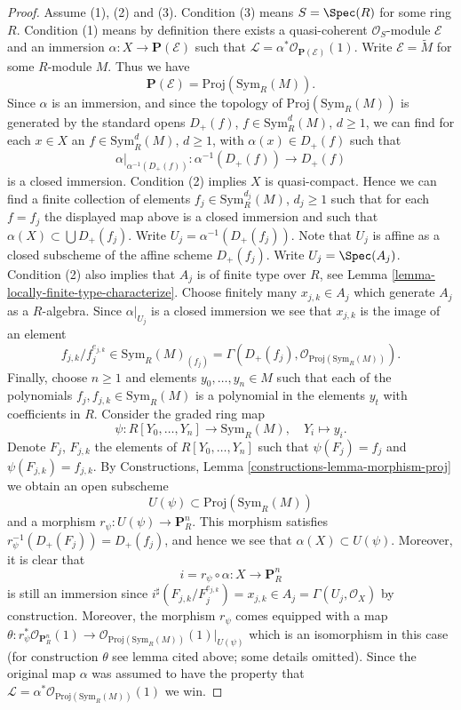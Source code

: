 \begin{proof}
Assume (1), (2) and (3).
Condition (3) means $S = \Spec(R)$ for some ring $R$.
Condition (1) means by definition
there exists a quasi-coherent $\mathcal{O}_S$-module
$\mathcal{E}$ and an immersion $\alpha : X \to \mathbf{P}(\mathcal{E})$
such that $\mathcal{L} = \alpha^*\mathcal{O}_{\mathbf{P}(\mathcal{E})}(1)$.
Write $\mathcal{E} = \widetilde{M}$ for some $R$-module $M$.
Thus we have
$$
\mathbf{P}(\mathcal{E}) = \text{Proj}(\text{Sym}_R(M)).
$$
Since $\alpha$ is an immersion, and since the topology of
$\text{Proj}(\text{Sym}_R(M))$ is generated by the standard
opens $D_{+}(f)$, $f \in \text{Sym}_R^d(M)$, $d \geq 1$,
we can find for each $x \in X$ an
$f \in \text{Sym}_R^d(M)$, $d \geq 1$, with $\alpha(x) \in D_{+}(f)$
such that
$$
\alpha|_{\alpha^{-1}(D_{+}(f))} : \alpha^{-1}(D_{+}(f)) \to D_{+}(f)
$$
is a closed immersion.
Condition (2) implies $X$ is quasi-compact. Hence we can find
a finite collection of elements
$f_j \in \text{Sym}_R^{d_j}(M)$, $d_j \geq 1$
such that for each $f = f_j$ the displayed map above
is a closed immersion and such that $\alpha(X) \subset \bigcup D_{+}(f_j)$.
Write $U_j = \alpha^{-1}(D_{+}(f_j))$. Note that $U_j$ is affine
as a closed subscheme of the affine scheme $D_{+}(f_j)$.
Write $U_j = \Spec(A_j)$. Condition (2) also implies that
$A_j$ is of finite type over $R$, see
Lemma \ref{lemma-locally-finite-type-characterize}.
Choose finitely many $x_{j, k} \in A_j$ which
generate $A_j$ as a $R$-algebra. Since $\alpha|_{U_j}$ is a closed
immersion we see that $x_{j, k}$ is the image of an element
$$
f_{j, k}/f_j^{e_{j, k}} \in \text{Sym}_R(M)_{(f_j)}
=
\Gamma(D_{+}(f_j), \mathcal{O}_{\text{Proj}(\text{Sym}_R(M))}).
$$
Finally, choose $n \geq 1$ and elements $y_0, \ldots, y_n \in M$ such that each
of the polynomials $f_j, f_{j, k} \in \text{Sym}_R(M)$ is a polynomial
in the elements $y_t$ with coefficients in $R$.
Consider the graded ring map
$$
\psi : R[Y_0, \ldots, Y_n] \longrightarrow \text{Sym}_R(M),
\quad Y_i \longmapsto y_i.
$$
Denote $F_j$, $F_{j, k}$ the elements of $R[Y_0, \ldots, Y_n]$ such
that $\psi(F_j) = f_j$ and $\psi(F_{j, k}) = f_{j, k}$.
By Constructions, Lemma \ref{constructions-lemma-morphism-proj}
we obtain an open subscheme
$$
U(\psi) \subset \text{Proj}(\text{Sym}_R(M))
$$
and a morphism
$r_\psi : U(\psi) \to \mathbf{P}^n_R$. This morphism
satisfies $r_\psi^{-1}(D_{+}(F_j)) = D_{+}(f_j)$, and hence we see
that $\alpha(X) \subset U(\psi)$. Moreover, it is clear
that
$$
i = r_\psi \circ \alpha : X \longrightarrow \mathbf{P}^n_R
$$
is still an immersion since
$i^\sharp(F_{j, k}/F_j^{e_{j, k}}) = x_{j, k} \in
A_j = \Gamma(U_j, \mathcal{O}_X)$
by construction. Moreover, the morphism $r_\psi$ comes
equipped with a map
$\theta : r_\psi^*\mathcal{O}_{\mathbf{P}^n_R}(1)
\to \mathcal{O}_{\text{Proj}(\text{Sym}_R(M))}(1)|_{U(\psi)}$
which is an isomorphism in this case (for construction $\theta$
see lemma cited above; some details omitted).
Since the original map $\alpha$ was assumed to have the
property that
$\mathcal{L} = \alpha^*\mathcal{O}_{\text{Proj}(\text{Sym}_R(M))}(1)$
we win.
\end{proof}

